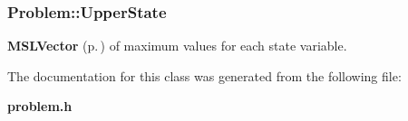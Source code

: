 \subsubsection{ Problem::Upper\-State}\label{class_Problem_m6}


{\bf MSLVector} {\rm (p.\,\pageref{class_MSLVector})} of maximum values for each state variable.



The documentation for this class was generated from the following file:\begin{CompactItemize}
\item 
{\bf problem.h}\end{CompactItemize}
